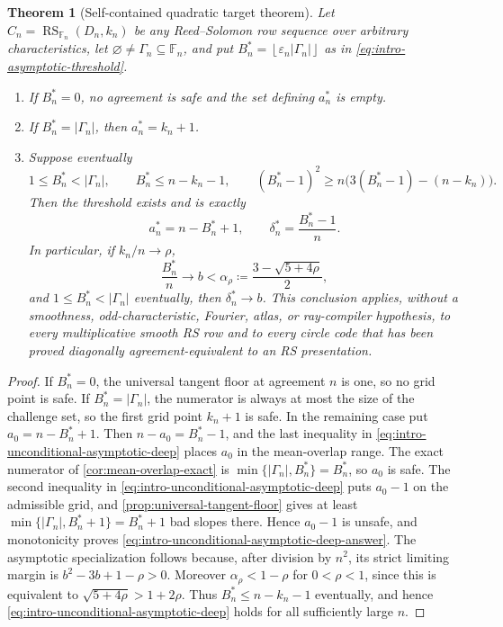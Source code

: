 \documentclass[11pt,a4paper]{amsart}
\numberwithin{equation}{section}
\newtheorem{theorem}{Theorem}[section]
\theoremstyle{remark}
\DeclareMathOperator{\RS}{RS}
\newcommand{\F}{\mathbb F}
\newcommand{\eps}{\varepsilon}
\newcommand{\abs}[1]{\lvert #1\rvert}
\newcommand{\floor}[1]{\left\lfloor #1\right\rfloor}
\newcommand{\defeq}{\coloneqq}
\begin{document}
\begin{theorem}[Self-contained quadratic target theorem]
\label{thm:intro-unconditional-asymptotic-deep}
Let \(C_n=\RS_{\F_n}(D_n,k_n)\) be any Reed--Solomon row sequence over
arbitrary characteristics, let
\(\varnothing\ne\Gamma_n\subseteq\F_n\), and put
\(B_n^*=\floor{\eps_n\abs{\Gamma_n}}\) as in
\eqref{eq:intro-asymptotic-threshold}.
\begin{enumerate}[label=\textup{(\roman*)},leftmargin=*]
\item If \(B_n^*=0\), no agreement is safe and the set defining
      \(a_n^*\) is empty.
\item If \(B_n^*=\abs{\Gamma_n}\), then \(a_n^*=k_n+1\).
\item Suppose eventually
\[
 1\le B_n^*<\abs{\Gamma_n},\qquad
 B_n^*\le n-k_n-1,\qquad
 (B_n^*-1)^2\ge
 n\bigl(3(B_n^*-1)-(n-k_n)\bigr).                  \tag{1.3}
 \label{eq:intro-unconditional-asymptotic-deep}
\]
Then the threshold exists and is exactly
\[
 a_n^*=n-B_n^*+1,\qquad
 \delta_n^*=\frac{B_n^*-1}{n}.                    \tag{1.4}
 \label{eq:intro-unconditional-asymptotic-deep-answer}
\]
In particular, if \(k_n/n\to\rho\),
\[
 \frac{B_n^*}{n}\longrightarrow b<
 \alpha_\rho\defeq\frac{3-\sqrt{5+4\rho}}2,
\]
and
\(1\le B_n^*<\abs{\Gamma_n}\) eventually, then
\(\delta_n^*\to b\).  This conclusion applies, without a smoothness,
odd-characteristic, Fourier, atlas, or ray-compiler hypothesis, to every
multiplicative smooth RS row and to every circle code that has been proved
diagonally agreement-equivalent to an RS presentation.
\end{enumerate}
\end{theorem}

\begin{proof}
If \(B_n^*=0\), the universal tangent floor at agreement \(n\) is one,
so no grid point is safe.  If \(B_n^*=\abs{\Gamma_n}\), the numerator is
always at most the size of the challenge set, so the first grid point
\(k_n+1\) is safe.  In the remaining case put
\(a_0=n-B_n^*+1\).  Then \(n-a_0=B_n^*-1\), and the last inequality in
\eqref{eq:intro-unconditional-asymptotic-deep} places \(a_0\) in the
mean-overlap range.  The exact numerator of
\cref{cor:mean-overlap-exact} is
\(\min\{\abs{\Gamma_n},B_n^*\}=B_n^*\), so \(a_0\) is safe.  The second
inequality in \eqref{eq:intro-unconditional-asymptotic-deep} puts
\(a_0-1\) on the admissible grid, and
\cref{prop:universal-tangent-floor} gives at least
\(\min\{\abs{\Gamma_n},B_n^*+1\}=B_n^*+1\) bad slopes there.  Hence
\(a_0-1\) is unsafe, and monotonicity proves
\eqref{eq:intro-unconditional-asymptotic-deep-answer}.  The asymptotic
specialization follows because, after division by \(n^2\), its strict
limiting margin is \(b^2-3b+1-\rho>0\).  Moreover
\(\alpha_\rho<1-\rho\) for \(0<\rho<1\), since this is equivalent to
\(\sqrt{5+4\rho}>1+2\rho\).  Thus \(B_n^*\le n-k_n-1\) eventually,
and hence
\eqref{eq:intro-unconditional-asymptotic-deep} holds for all sufficiently
large \(n\).
\end{proof}
\end{document}

